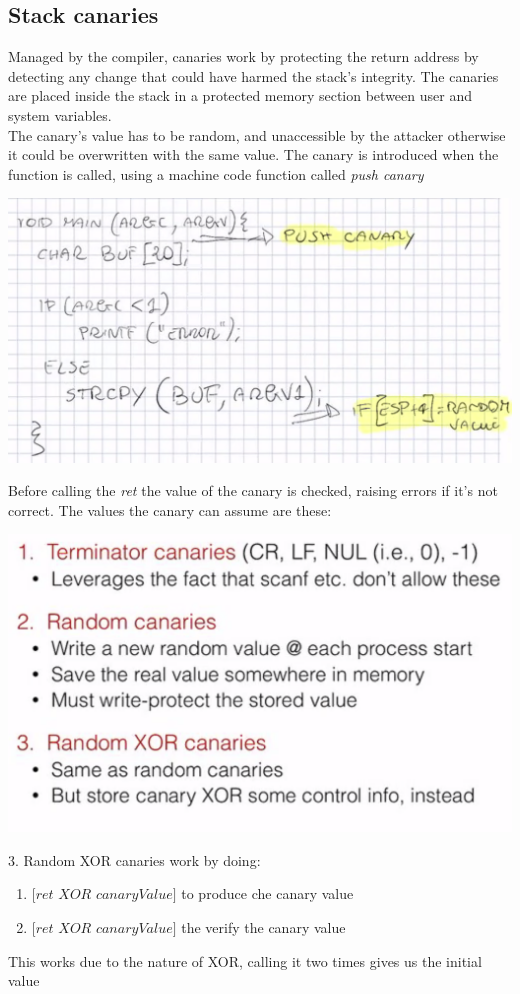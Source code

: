 \documentclass[11pt, oneside]{article}   	%
\begin{document}
\subsection*{Stack canaries}
Managed by the compiler, canaries work by protecting the return address by detecting any change that could have harmed the stack's integrity. The canaries are placed inside the stack in a protected memory section between user and system variables. \\The canary's value has to be random, and unaccessible by the attacker otherwise it could be overwritten with the same value.
The canary is introduced when the function is called, using a machine code function called \emph{push canary}
\begin{center}
\includegraphics[scale = 0.6]{pushcanary}
\end{center}
Before calling the \emph{ret} the value of the canary is checked, raising errors if it's not correct.
The values the canary can assume are these:
\begin{center}
\includegraphics[scale = 0.6]{values}
\end{center}
3. Random XOR canaries work by doing:
\begin{enumerate}
\item $[ret$ $XOR$ $canaryValue]$ to produce che canary value
\item $[ret$ $XOR$ $canaryValue]$ the verify the canary value
\end{enumerate}
This works due to the nature of XOR, calling it two times gives us the initial value
\end{document}
